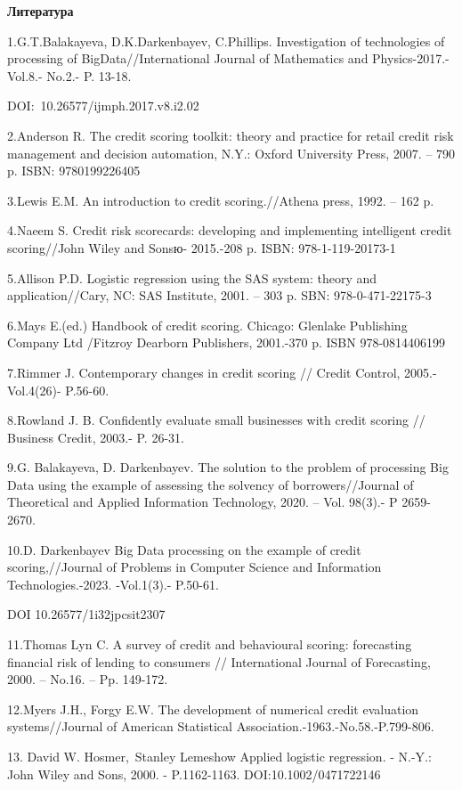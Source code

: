 {\bfseries Литература}

1.G.T.Balakayeva, D.K.Darkenbayev, C.Phillips. Investigation of
technologies of processing of BigData//International Journal of
Mathematics and Physics-2017.-Vol.8.- No.2.- P. 13-18.

DOI:~10.26577/ijmph.2017.v8.i2.02

2.Anderson R. The credit scoring toolkit: theory and practice for retail
credit risk management and decision automation, N.Y.: Oxford University
Press, 2007. -- 790 p. ISBN: 9780199226405

3.Lewis E.M. An introduction to credit scoring.//Athena press, 1992. --
162 p.

4.Naeem S. Credit risk scorecards: developing and implementing
intelligent credit scoring//John Wiley and Sonsю- 2015.-208 p. ISBN:
978-1-119-20173-1

5.Allison P.D. Logistic regression using the SAS system: theory and
application//Cary, NC: SAS Institute, 2001. -- 303 p. SBN:
978-0-471-22175-3

6.Mays E.(ed.) Handbook of credit scoring. Chicago: Glenlake Publishing
Company Ltd /Fitzroy Dearborn Publishers, 2001.-370 p. ISBN
978-0814406199

7.Rimmer J. Contemporary changes in credit scoring // Credit Control,
2005.-Vol.4(26)- P.56-60.

8.Rowland J. B. Confidently evaluate small businesses with credit
scoring // Business Credit, 2003.- P. 26-31.

9.G. Balakayeva, D. Darkenbayev. The solution to the problem of
processing Big Data using the example of assessing the solvency of
borrowers//Journal of Theoretical and Applied Information Technology,
2020. -- Vol. 98(3).- P 2659-2670.

10.D. Darkenbayev Big Data processing on the example of credit
scoring,//Journal of Problems in Computer Science and Information
Technologies.-2023. -Vol.1(3).- P.50-61.

DOI 10.26577/1i32jpcsit2307

11.Thomas Lyn C. A survey of credit and behavioural scoring: forecasting
financial risk of lending to consumers // International Journal of
Forecasting, 2000. -- No.16. -- Pp. 149-172.

12.Myers J.H., Forgy E.W. The development of numerical credit evaluation
systems//Journal of American Statistical
Association.-1963.-No.58.-P.799-806.

13. David W. Hosmer,~Stanley Lemeshow Applied logistic regression. -
N.-Y.: John Wiley and Sons, 2000. - P.1162-1163. DOI:10.1002/0471722146

